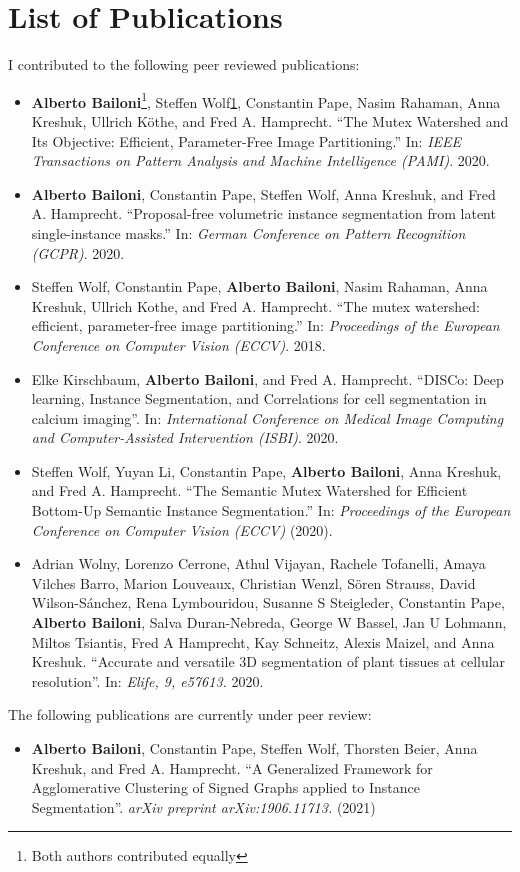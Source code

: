 

\chapter*{List of Publications}

I contributed to the following peer reviewed publications:

\begin{itemize}
\item \textbf{Alberto Bailoni}\footnote{Both authors contributed equally\label{note1}}, Steffen Wolf\cref{note1}, Constantin Pape, Nasim Rahaman, Anna Kreshuk, Ullrich K\"othe, and Fred A. Hamprecht. ``The Mutex Watershed and Its Objective: Efficient, Parameter-Free Image Partitioning.'' In: \emph{IEEE Transactions on Pattern Analysis and Machine Intelligence (PAMI)}. 2020.
\item \textbf{Alberto Bailoni}, Constantin Pape, Steffen Wolf, Anna Kreshuk, and Fred A. Hamprecht. ``Proposal-free volumetric instance segmentation from latent single-instance masks.'' In: \emph{ German Conference on Pattern Recognition (GCPR)}. 2020.
\item Steffen Wolf, Constantin Pape, \textbf{Alberto Bailoni}, Nasim Rahaman, Anna Kreshuk, Ullrich Kothe, and Fred A. Hamprecht. ``The mutex watershed: efficient, parameter-free image partitioning.'' In: \emph{Proceedings of the European Conference on Computer Vision (ECCV)}. 2018.
\item Elke Kirschbaum, \textbf{Alberto Bailoni}, and Fred A. Hamprecht. ``DISCo: Deep learning, Instance Segmentation, and Correlations for cell segmentation in calcium imaging''. In: \emph{International Conference on Medical Image Computing and Computer-Assisted Intervention (ISBI)}. 2020.
\item Steffen Wolf, Yuyan Li, Constantin Pape, \textbf{Alberto Bailoni}, Anna Kreshuk, and Fred A. Hamprecht. ``The Semantic Mutex Watershed for Efficient Bottom-Up Semantic Instance Segmentation.'' In: \emph{Proceedings of the European Conference on Computer Vision (ECCV)} (2020).
\item Adrian Wolny, Lorenzo Cerrone, Athul Vijayan, Rachele Tofanelli, Amaya Vilches Barro, Marion Louveaux, Christian Wenzl, S\"oren Strauss, David Wilson-S\'anchez, Rena Lymbouridou, Susanne S Steigleder, Constantin Pape, \textbf{Alberto Bailoni}, Salva Duran-Nebreda, George W Bassel, Jan U Lohmann, Miltos Tsiantis, Fred A Hamprecht, Kay Schneitz, Alexis Maizel, and Anna Kreshuk. ``Accurate and versatile 3D segmentation of plant tissues at cellular resolution''. In: \emph{Elife, 9, e57613.} 2020.
\end{itemize}

\noindent The following publications are currently under peer review:
\begin{itemize}
\item \textbf{Alberto Bailoni}, Constantin Pape, Steffen Wolf, Thorsten Beier, Anna Kreshuk, and Fred A. Hamprecht. ``A Generalized Framework for Agglomerative Clustering of Signed Graphs applied to Instance Segmentation''. \emph{arXiv preprint arXiv:1906.11713.} (2021)
\end{itemize}
